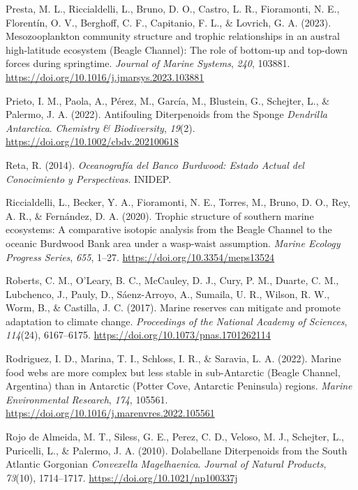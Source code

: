 \documentclass[preprint, 3p,
authoryear]{elsarticle} %
\newlength{\cslhangindent}
\newlength{\cslentryspacingunit} %
\newenvironment{CSLReferences}[2] %
 {%
  \setlength{\parindent}{0pt}
  \ifodd #1
  \let\oldpar\par
  \def\par{\hangindent=\cslhangindent\oldpar}
  \fi
  \setlength{\parskip}{#2\cslentryspacingunit}
 }%
 {}
\begin{document}
\begin{CSLReferences}{1}{0}
\leavevmode{}%
Presta, M. L., Riccialdelli, L., Bruno, D. O., Castro, L. R.,
Fioramonti, N. E., Florentín, O. V., Berghoff, C. F., Capitanio, F. L.,
\& Lovrich, G. A. (2023). Mesozooplankton community structure and
trophic relationships in an austral high-latitude ecosystem ({Beagle
Channel}): {The} role of bottom-up and top-down forces during
springtime. \emph{Journal of Marine Systems}, \emph{240}, 103881.
\url{https://doi.org/10.1016/j.jmarsys.2023.103881}

\leavevmode{}%
Prieto, I. M., Paola, A., Pérez, M., García, M., Blustein, G., Schejter,
L., \& Palermo, J. A. (2022). Antifouling {Diterpenoids} from the
{Sponge} {\emph{Dendrilla}}{ \emph{Antarctica}}. \emph{Chemistry \&
Biodiversity}, \emph{19}(2).
\url{https://doi.org/10.1002/cbdv.202100618}

\leavevmode{}%
Reta, R. (2014). \emph{Oceanografía del {Banco Burdwood}: {Estado
Actual} del {Conocimiento} y {Perspectivas}}. {INIDEP}.

\leavevmode{}%
Riccialdelli, L., Becker, Y. A., Fioramonti, N. E., Torres, M., Bruno,
D. O., Rey, A. R., \& Fernández, D. A. (2020). Trophic structure of
southern marine ecosystems: A comparative isotopic analysis from the
{Beagle Channel} to the oceanic {Burdwood Bank} area under a wasp-waist
assumption. \emph{Marine Ecology Progress Series}, \emph{655}, 1--27.
\url{https://doi.org/10.3354/meps13524}

\leavevmode{}%
Roberts, C. M., O'Leary, B. C., McCauley, D. J., Cury, P. M., Duarte, C.
M., Lubchenco, J., Pauly, D., Sáenz-Arroyo, A., Sumaila, U. R., Wilson,
R. W., Worm, B., \& Castilla, J. C. (2017). Marine reserves can mitigate
and promote adaptation to climate change. \emph{Proceedings of the
National Academy of Sciences}, \emph{114}(24), 6167--6175.
\url{https://doi.org/10.1073/pnas.1701262114}

\leavevmode{}%
Rodriguez, I. D., Marina, T. I., Schloss, I. R., \& Saravia, L. A.
(2022). Marine food webs are more complex but less stable in
sub-{Antarctic} ({Beagle Channel}, {Argentina}) than in {Antarctic}
({Potter Cove}, {Antarctic Peninsula}) regions. \emph{Marine
Environmental Research}, \emph{174}, 105561.
\url{https://doi.org/10.1016/j.marenvres.2022.105561}

\leavevmode{}%
Rojo de Almeida, M. T., Siless, G. E., Perez, C. D., Veloso, M. J.,
Schejter, L., Puricelli, L., \& Palermo, J. A. (2010). Dolabellane
{Diterpenoids} from the {South Atlantic Gorgonian} {\emph{Convexella}}{
\emph{Magelhaenica}}. \emph{Journal of Natural Products}, \emph{73}(10),
1714--1717. \url{https://doi.org/10.1021/np100337j}


\end{CSLReferences}
\end{document}
